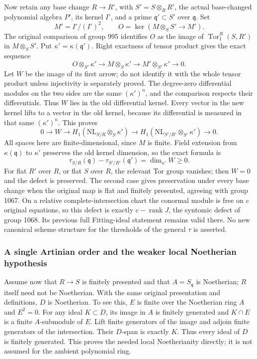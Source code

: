 Now retain any base change \(R\to R'\), with \(S'=S\otimes_RR'\), the actual base-changed polynomial algebra \(P'\), its kernel \(I'\), and a prime \(\mathfrak q'\subset S'\) over \(\mathfrak q\). Set \[
M' = I'/(I')^2,\qquad
O=\ker(M\otimes_SS'\longrightarrow M').
\] The original comparison of group 995 identifies \(O\) as the image of \(\operatorname{Tor}_1^R(S,R')\) in \(M\otimes_SS'\). Put \(\kappa'=\kappa(\mathfrak q')\). Right exactness of tensor product gives the exact sequence \[
O\otimes_{S'}\kappa'\longrightarrow
M\otimes_S\kappa'\longrightarrow M'\otimes_{S'}\kappa'\longrightarrow0.
\] Let \(W\) be the image of its first arrow; do not identify it with the whole tensor product unless injectivity is separately proved. The degree-zero differential modules on the two sides are the same \((\kappa')^n\), and the comparison respects their differentials. Thus \(W\) lies in the old differential kernel. Every vector in the new kernel lifts to a vector in the old kernel, because its differential is measured in that same \((\kappa')^n\). This proves \[
0\longrightarrow W\longrightarrow
H_1(\mathrm{NL}_{S/R}\otimes_S\kappa')
\longrightarrow
H_1(\mathrm{NL}_{S'/R'}\otimes_{S'}\kappa')
\longrightarrow0.
\] All spaces here are finite-dimensional, since \(M\) is finite. Field extension from \(\kappa(\mathfrak q)\) to \(\kappa'\) preserves the old kernel dimension, so the exact formula is \[
\tau_{S/R}(\mathfrak q)-\tau_{S'/R'}(\mathfrak q')
=\dim_{\kappa'}W\ge0.
\] For flat \(R'\) over \(R\), or flat \(S\) over \(R\), the relevant Tor group vanishes; then \(W=0\) and the defect is preserved. The second case gives preservation under every base change when the original map is flat and finitely presented, agreeing with group 1067. On a relative complete-intersection chart the conormal module is free on \(c\) original equations, so this defect is exactly \(c-\operatorname{rank}J\), the syntomic defect of group 1068. Its previous full Fitting-ideal statement remains valid there. No new canonical scheme structure for the thresholds of the general \(\tau\) is asserted.

\subsubsection{A single Artinian order and the weaker local Noetherian hypothesis}\label{algebra-proof-050-a-single-artinian-order-and-the-weaker-local-noetherian-hypothesis}

Assume now that \(R\to S\) is finitely presented and that \(A=S_{\mathfrak q}\) is Noetherian; \(R\) itself need not be Noetherian. With the same original presentation and definitions, \(D\) is Noetherian. To see this, \(E\) is finite over the Noetherian ring \(A\) and \(E^2=0\). For any ideal \(K\subset D\), its image in \(A\) is finitely generated and \(K\cap E\) is a finite \(A\)-submodule of \(E\). Lift finite generators of the image and adjoin finite generators of the intersection. Their \(D\)-span is exactly \(K\). Thus every ideal of \(D\) is finitely generated. This proves the needed local Noetherianity directly; it is not assumed for the ambient polynomial ring.

